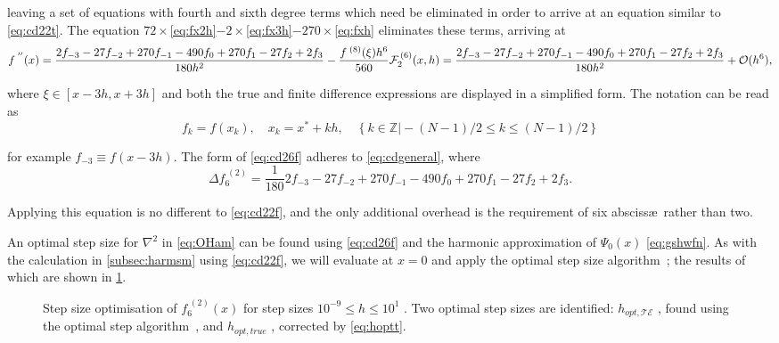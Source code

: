 leaving a set of equations with fourth and sixth degree terms which need be eliminated in order to arrive at an equation similar to \cref{eq:cd22t}.
The equation $72\times$\cref{eq:fx2h}$-2\times$\cref{eq:fx3h}$-270\times$\cref{eq:fxh} eliminates these terms, arriving at
{\mathindent=0.3cm
\begin{equation}
f^{\;''}(x) = \frac{2f_{-3}-27f_{-2}+270f_{-1}-490f_{0}+270f_{1}-27f_{2}+2f_{3}}{180h^{2}}-\frac{f^{\;(8)}(\xi)h^6}{560}\label{eq:cd26t}\\
\mathcal{F}_2^{\,(6)}(x,h) = \frac{2f_{-3}-27f_{-2}+270f_{-1}-490f_{0}+270f_{1}-27f_{2}+2f_{3}}{180h^{2}} + \mathcal{O}(h^6),\label{eq:cd26f}
\end{equation}
}

where $\xi \in [x-3h,x+3h]$ and both the true and finite difference expressions are displayed in a simplified form.
The notation can be read as
\begin{equation}
f_k = f(x_k), \quad x_k=x^*+kh, \quad \left\{k \in \mathds{Z} \vert -(N-1)/2 \leq k \leq  (N-1)/2 \right\}
\end{equation}

for example $f_{-3} \equiv f(x-3h)$.
The form of \cref{eq:cd26f} adheres to \cref{eq:cdgeneral}, where
\begin{equation}
\Delta f_6^{\;(2)} = \frac{1}{180}2f_{-3}-27f_{-2}+270f_{-1}-490f_{0}+270f_{1}-27f_{2}+2f_{3}.\label{eq:f62x}
\end{equation}

Applying this equation is no different to \cref{eq:cd22f}, and the only additional overhead is the requirement of six absciss\ae\ rather than two.

An optimal step size for $\nabla^2$ in \cref{eq:OHam} can be found using  \cref{eq:cd26f} and the harmonic approximation of $\Psi_0(x)$ \cref{eq:gshwfn}.
As with the calculation in \cref{subsec:harmsm} using \cref{eq:cd22f}, we will evaluate at $x = 0$ and apply the optimal step size algorithm~\cite{Mathur2012}; the results of which are shown in \cref{fig:hopt7pt}.
\begin{figure}[htp]
\centering
\resizebox{\columnwidth}{!}{}
\caption[Step size optimisation of $f_2^{\;(6)}(x)$]{\label{fig:hopt7pt}Step size optimisation of $f_6^{\;(2)}(x)$ for step sizes $10^{-9}\!\leq\! h\! \leq\! 10^1$ . Two optimal step sizes are identified: $h_{opt,\mathcal{TE}}$ , found using the optimal step algorithm~\cite{Mathur2012}, and $h_{opt,true}$ , corrected by \cref{eq:hoptt}.}
\end{figure}

